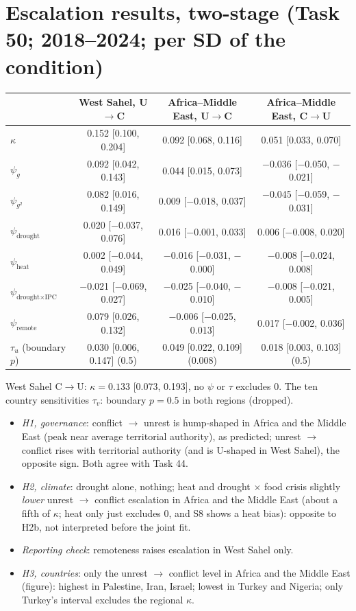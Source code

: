\documentclass[10pt]{article}
\begin{document}
\section*{Escalation results, two-stage (Task 50; 2018--2024; per SD of the condition)}
{\footnotesize\setlength{\tabcolsep}{4pt}\begin{tabular}{@{}lccc@{}}
\toprule
 & West Sahel, U$\to$C & Africa--Middle East, U$\to$C & Africa--Middle East, C$\to$U \\
\midrule
$\kappa$ & 0.152 [0.100, 0.204] & 0.092 [0.068, 0.116] & 0.051 [0.033, 0.070] \\
$\psi_g$ & 0.092 [0.042, 0.143] & 0.044 [0.015, 0.073] & $-$0.036 [$-$0.050, $-$0.021] \\
$\psi_{g^2}$ & 0.082 [0.016, 0.149] & 0.009 [$-$0.018, 0.037] & $-$0.045 [$-$0.059, $-$0.031] \\
$\psi_{\text{drought}}$ & 0.020 [$-$0.037, 0.076] & 0.016 [$-$0.001, 0.033] & 0.006 [$-$0.008, 0.020] \\
$\psi_{\text{heat}}$ & 0.002 [$-$0.044, 0.049] & $-$0.016 [$-$0.031, $-$0.000] & $-$0.008 [$-$0.024, 0.008] \\
$\psi_{\text{drought}\times\text{IPC}}$ & $-$0.021 [$-$0.069, 0.027] & $-$0.025 [$-$0.040, $-$0.010] & $-$0.008 [$-$0.021, 0.005] \\
$\psi_{\text{remote}}$ & 0.079 [0.026, 0.132] & $-$0.006 [$-$0.025, 0.013] & 0.017 [$-$0.002, 0.036] \\
$\tau_u$ (boundary $p$) & 0.030 [0.006, 0.147] (0.5) & 0.049 [0.022, 0.109] (0.008) & 0.018 [0.003, 0.103] (0.5) \\
\bottomrule
\end{tabular}}

West Sahel C$\to$U: $\kappa = 0.133$ [0.073, 0.193], no $\psi$ or $\tau$ excludes 0. The ten country sensitivities
$\tau_{v}$: boundary $p = 0.5$ in both regions (dropped).
\begin{itemize}
\item \emph{H1, governance}: conflict $\to$ unrest is hump-shaped in Africa and the Middle East (peak near average
territorial authority), as predicted; unrest $\to$ conflict rises with territorial authority (and is U-shaped in West
Sahel), the opposite sign. Both agree with Task 44.
\item \emph{H2, climate}: drought alone, nothing; heat and drought $\times$ food crisis slightly \emph{lower} unrest $\to$
conflict escalation in Africa and the Middle East (about a fifth of $\kappa$; heat only just excludes 0, and S8 shows a heat
bias): opposite to H2b, not interpreted before the joint fit.
\item \emph{Reporting check}: remoteness raises escalation in West Sahel only.
\item \emph{H3, countries}: only the unrest $\to$ conflict level in Africa and the Middle East (figure): highest in
Palestine, Iran, Israel; lowest in Turkey and Nigeria; only Turkey's interval excludes the regional $\kappa$.
\end{itemize}
\end{document}
